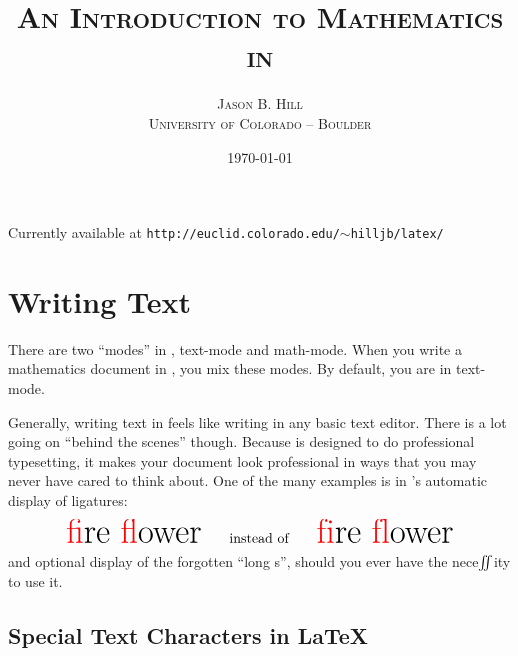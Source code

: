 \documentclass[letterpaper,twoside,10pt]{article}
\author{\textsc{Jason B. Hill}\\\textsc{\small University of Colorado -- Boulder}}
\title{\textsc{An Introduction to Mathematics in {\LaTeXe}}}
\date{\textsc{\today}}
\begin{document}
\maketitle

\begin{center}
	{\small Currently available at \texttt{http://euclid.colorado.edu/$\sim$hilljb/latex/}}
\end{center}


\tableofcontents
\thispagestyle{empty}

\newpage
\setcounter{page}{1}


\section{Writing Text}

There are two ``modes'' in \LaTeXe, text-mode and math-mode. When you write a mathematics document in \LaTeXe, you mix these modes. By default, you are in text-mode.

\bigbreak
Generally, writing text in {\LaTeXe} feels like writing in any basic text editor. There is a lot going on ``behind the scenes'' though. Because {\LaTeXe} is designed to do professional typesetting, it makes your document look professional in ways that you may never have cared to think about. One of the many examples is in {\LaTeXe}'s automatic display of ligatures:
\[
	\text{{\Huge {\color{red}fi}re {\color{red}fl}ower}\qquad instead of\qquad {\Huge {\color{red}f\mbox{}i}re {\color{red}f\mbox{}l}ower}}
\]
and optional display of the forgotten ``long s'', should you ever have the nece\hspace{-0.2em}\mbox{$\int\hspace{-0.5em}\int$}\hspace{-0.15em}ity to use it.

\subsection{Special Text Characters in {\LaTeX}}
\end{document}
